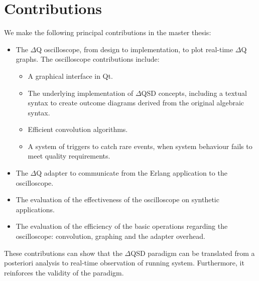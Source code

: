 \section{Contributions}
    We make the following principal contributions in the master thesis:
    \begin{itemize}
        \item The $\Delta$Q oscilloscope, from design to implementation, to plot real-time $\Delta$Q graphs. The oscilloscope contributions include:
        \begin{itemize}
            \item A graphical interface in Qt.
            \item The underlying implementation of $\Delta$QSD concepts, including a textual syntax to create outcome diagrams derived from the original algebraic syntax.
            \item Efficient convolution algorithms.
            \item A system of triggers to catch rare events, when system behaviour fails to meet quality requirements.
        \end{itemize}
        \item The $\Delta$Q adapter to communicate from the Erlang application to the oscilloscope.
        \item The evaluation of the effectiveness of the oscilloscope on synthetic applications.
        \item The evaluation of the efficiency of the basic operations regarding the oscilloscope: convolution, graphing and the adapter overhead.
    \end{itemize}

    These contributions can show that the $\Delta$QSD paradigm can be translated from a posteriori analysis to real-time observation of running system. Furthermore, it reinforces the validity of the paradigm.

